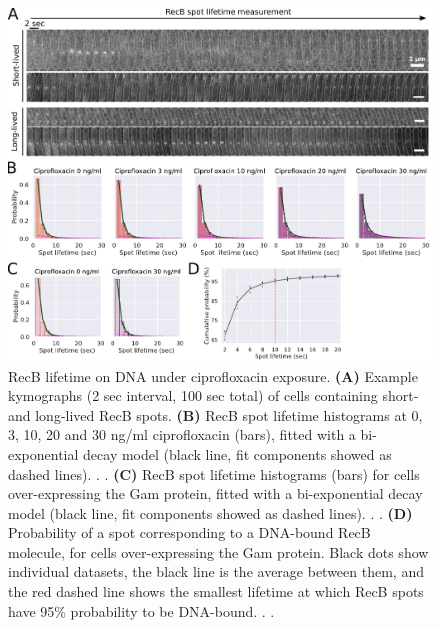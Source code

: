 \begin{figure}[htbp]
    \centering
    \includegraphics[width=.8\textwidth]{Figures/Fig2_RecB_lifetime.pdf}
    \caption{RecB lifetime on DNA under ciprofloxacin exposure. \textbf{(A)} Example kymographs (2 sec interval, 100 sec total) of cells containing short- and long-lived RecB spots. \textbf{(B)} RecB spot lifetime histograms at 0, 3, 10, 20 and 30 ng/ml ciprofloxacin (bars), fitted with a bi-exponential decay model (black line, fit components showed as dashed lines). . . \textbf{(C)} RecB spot lifetime histograms (bars) for cells over-expressing the Gam protein, fitted with a bi-exponential decay model (black line, fit components showed as dashed lines). . . \textbf{(D)} Probability of a spot corresponding to a DNA-bound RecB molecule, for cells over-expressing the Gam protein. Black dots show individual datasets, the black line is the average between them, and the red dashed line shows the smallest lifetime at which RecB spots have 95\% probability to be DNA-bound. . .}
    \label{Fig:lifetimes}
\end{figure}

